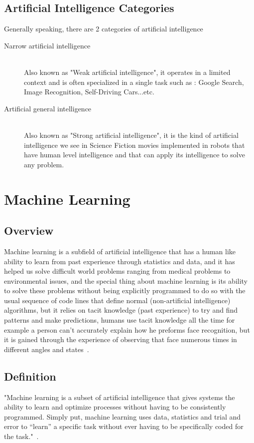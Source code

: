     \subsection{Artificial Intelligence Categories}
        Generally speaking, there are 2 categories of artificial intelligence ~\cite{ai}

            \begin{description} 
            \item[Narrow artificial intelligence] \hfill \\
                Also known as "Weak artificial intelligence", it operates in a limited context and is often specialized in a single task such as : Google Search, Image Recognition, Self-Driving Cars...etc.
            \item[Artificial general intelligence] \hfill \\
                Also known as "Strong artificial intelligence", it is the kind of artificial intelligence we see in Science Fiction movies implemented in robots that have human level intelligence and that can apply its intelligence to solve any problem.
            \end{description}
\section{Machine Learning}
    \subsection{Overview}
        Machine learning is a subfield of artificial intelligence that has a human like ability to learn from past experience through statistics and data, and it has helped us solve difficult world problems ranging from medical problems to environmental issues, and the special thing about machine learning is its ability to solve these problems without being explicitly programmed to do so with the usual sequence of code lines that define normal (non-artificial intelligence) algorithms, but it relies on tacit knowledge (past experience) to try and find patterns and make predictions, humans use tacit knowledge all the time for example a person can't accurately explain how he preforms face recognition, but it is gained through the experience of observing that face numerous times in different angles and states~\cite{ml}.

    \subsection{Definition}
        "Machine learning is a subset of artificial intelligence that gives systems the ability to learn and optimize processes without having to be consistently programmed. Simply put, machine learning uses data, statistics and trial and error to “learn” a specific task without ever having to be specifically coded for the task."~\cite{ml}.

